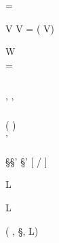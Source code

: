 
\def\RuleNamePrefix{TC-}
\def\RuleCmdPrefix{TypeConcatenation}

 { } {
    \ConcatType {\T} {\SSkip} = \T
}

 {
    V \neq \SSkip
}{
    \ConcatType {(\SSeq {\T}{\TU})} {V} = \SSeq {\T} {(\ConcatType {\TU} {V})}
}

 {
    \T \neq {} {W} \\
    \TU \neq \SSkip
}{
    \ConcatType {\T} {\TU} = \SSeq {\T} {\TU}
}


\def\RuleNamePrefix{TN-}
\def\RuleCmdPrefix{TypeNormalisation}

 {
    {\T} \SEq \SSkip \\
    \NormaliseType {\TU} {\TU'}
}{
    \NormaliseType {\SSeq \T \TU} {\TU'}
}

 {
    \neg ({\T} \SEq \SSkip) \\
    \NormaliseType {\T} {\T'}
}{
    \NormaliseType {\SSeq {\T} \TU} { {\TU}}
}

 {
    \NormaliseType \S {\S'}
}{
    \NormaliseType {\SRec \SVar \S} {{\S'} [{\SRec {}} / \SVar]}
}

 { }{
     {\SChoice {\ell: \SSeq {\S[\ell]} {\T}} {\ell\in L}}
}

 { }{
     {\SBranch {\ell: \SSeq {\S[\ell]} {\T}} {\ell\in L}}
}

 {
    \T \neq (\SSeq {\TU} {\T}, \SRec {\SVar} {\S}, \SChoice {\ell:\S[\ell]} {\ell\in L})
}{
    \NormaliseType {\T} {\T}
}
